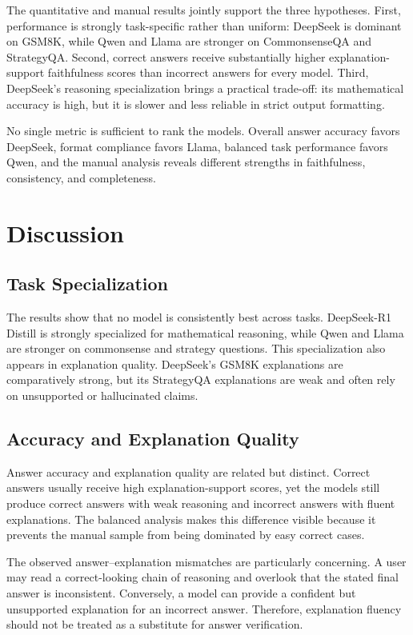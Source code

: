 \documentclass{article}
\begin{document}
The quantitative and manual results jointly support the three hypotheses. First, performance is strongly task-specific rather than uniform: DeepSeek is dominant on GSM8K, while Qwen and Llama are stronger on CommonsenseQA and StrategyQA. Second, correct answers receive substantially higher explanation-support faithfulness scores than incorrect answers for every model. Third, DeepSeek's reasoning specialization brings a practical trade-off: its mathematical accuracy is high, but it is slower and less reliable in strict output formatting.

No single metric is sufficient to rank the models. Overall answer accuracy favors DeepSeek, format compliance favors Llama, balanced task performance favors Qwen, and the manual analysis reveals different strengths in faithfulness, consistency, and completeness.

\section{Discussion}

\subsection{Task Specialization}

The results show that no model is consistently best across tasks. DeepSeek-R1 Distill is strongly specialized for mathematical reasoning, while Qwen and Llama are stronger on commonsense and strategy questions. This specialization also appears in explanation quality. DeepSeek's GSM8K explanations are comparatively strong, but its StrategyQA explanations are weak and often rely on unsupported or hallucinated claims.

\subsection{Accuracy and Explanation Quality}

Answer accuracy and explanation quality are related but distinct. Correct answers usually receive high explanation-support scores, yet the models still produce correct answers with weak reasoning and incorrect answers with fluent explanations. The balanced analysis makes this difference visible because it prevents the manual sample from being dominated by easy correct cases.

The observed answer--explanation mismatches are particularly concerning. A user may read a correct-looking chain of reasoning and overlook that the stated final answer is inconsistent. Conversely, a model can provide a confident but unsupported explanation for an incorrect answer. Therefore, explanation fluency should not be treated as a substitute for answer verification.
\end{document}

